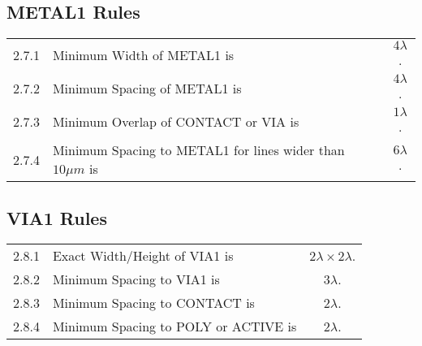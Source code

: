 \subsection{METAL1 Rules}\label{design_rules_metal1_rules}

\begin{center}
\end{center}

\begin{flushleft}
    \begin{tabular}{c l c}
        2.7.1   & Minimum Width of METAL1 is & $4 \lambda$. \\
        2.7.2   & Minimum Spacing of METAL1 is & $4 \lambda$. \\
        2.7.3   & Minimum Overlap of CONTACT or VIA is & $1 \lambda$. \\
        2.7.4   & Minimum Spacing to METAL1 for lines wider than $10 \mu m$ is & $6 \lambda$. \\
    \end{tabular}
\end{flushleft}

\subsection{VIA1 Rules}\label{design_rules_via1_rules}

\begin{flushleft}
    \begin{tabular}{c l c}
        2.8.1   & Exact Width/Height of VIA1 is & $ 2 \lambda \times 2 \lambda$. \\
        2.8.2   & Minimum Spacing to VIA1 is & $3 \lambda$. \\
        2.8.3   & Minimum Spacing to CONTACT is & $2 \lambda$. \\
        2.8.4   & Minimum Spacing to POLY or ACTIVE is & $2 \lambda$. \\
    \end{tabular}
\end{flushleft}

